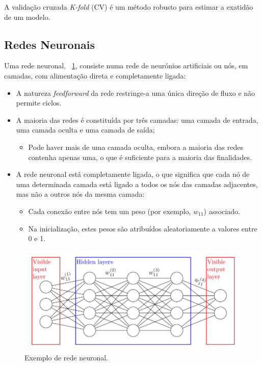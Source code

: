 \documentclass[conference]{IEEEtran}
\begin{document}
A validação cruzada \textit{K-fold} (CV) é um método robusto para estimar a exatidão de um modelo. \cite{madureira2024cv}

\subsection{Redes Neuronais}

Uma rede neuronal, \figurename~\ref{fig:nn}, consiste numa rede de neurónios artificiais ou nós, em camadas, com alimentação direta e completamente ligada:

\begin{itemize}
	\item A natureza \textit{feedforward} da rede restringe-a uma única direção de fluxo e não permite ciclos. 
	\item A maioria das redes é constituída por três camadas: uma camada de entrada, uma camada oculta e uma camada de saída; 
	\begin{itemize}
		\item Pode haver mais de uma camada oculta, embora a maioria das redes contenha apenas uma, o que é suficiente para a maioria das finalidades.
	\end{itemize}
	
	  
	\item  A rede neuronal está completamente ligada, o que significa que cada nó de uma determinada camada está ligado a todos os nós das camadas adjacentes, mas não a outros nós da mesma camada:
	\begin{itemize}
		\item Cada conexão entre nós tem um peso (por exemplo, $w_{11}$) associado.
		\item  Na inicialização, estes pesos são atribuídos aleatoriamente a valores entre 0 e 1.
	\end{itemize}
\end{itemize}

\begin{figure}
	\centering
	\includegraphics[width=0.9\linewidth]{NN}
	\caption{Exemplo de rede neuronal.}
	\label{fig:nn}
\end{figure}
\end{document}

